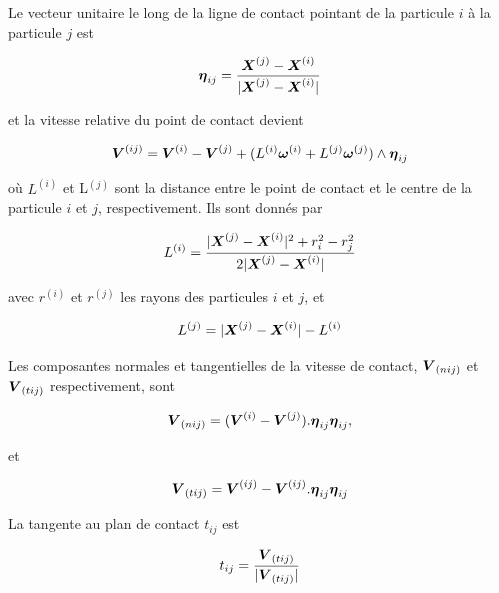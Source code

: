 Le vecteur unitaire le long de la ligne de contact pointant de la particule $i$ à la particule $j$ est

\begin{equation} \label{eq: 2}
\boldsymbol{\eta}_{ij} = \frac{\boldsymbol{X}^{(j)} - \boldsymbol{X}^{(i)}}{|\boldsymbol{X}^{(j)} - \boldsymbol{X}^{(i)}|}
\end{equation}

et la vitesse relative du point de contact devient

\begin{equation} \label{eq: 3}
\boldsymbol{V}^{(ij)} = \boldsymbol{V}^{(i)} - \boldsymbol{V}^{(j)} + ( L^{(i)} \boldsymbol{\omega}^{(i)} + L^{(j)} \boldsymbol{\omega}^{(j)} ) \wedge \boldsymbol{\eta}_{ij}
\end{equation}

où $L^{(i)}$ et L$^{(j)}$ sont la distance entre le point de contact et le centre de la particule $i$ et $j$, respectivement. Ils sont donnés par

\begin{equation} \label{eq: 4}
L^{(i)} = \frac{|\boldsymbol{X}^{(j)} - \boldsymbol{X}^{(i)}|^2 + r_i^2 - r_j^2}{2|\boldsymbol{X}^{(j)} - \boldsymbol{X}^{(i)}|}
\end{equation}

avec $r^{(i)}$ et $r^{(j)}$ les rayons des particules $i$ et $j$, et

\begin{equation} \label{eq: 5}
L^{(j)} = |\boldsymbol{X}^{(j)} - \boldsymbol{X}^{(i)}| - L^{(i)}
\end{equation}

Les composantes normales et tangentielles de la vitesse de contact, $\boldsymbol{V}_{(nij)}$ et $\boldsymbol{V}_{(tij)}$ respectivement, sont

\begin{equation} \label{eq: 6}
\boldsymbol{V}_{(nij)} = (\boldsymbol{V}^{(i)} - \boldsymbol{V}^{(j)}) . \boldsymbol{\eta}_{ij} \boldsymbol{\eta}_{ij},
\end{equation}

et

\begin{equation} \label{eq: 7}
\boldsymbol{V}_{(tij)} = \boldsymbol{V}^{(ij)} - \boldsymbol{V}^{(ij)} . \boldsymbol{\eta}_{ij} \boldsymbol{\eta}_{ij}
\end{equation}

La tangente au plan de contact $t_{ij}$ est

\begin{equation} \label{eq: 8}
t_{ij} = \frac{\boldsymbol{V}_{(tij)}}{|\boldsymbol{V}_{(tij)}|}
\end{equation}

